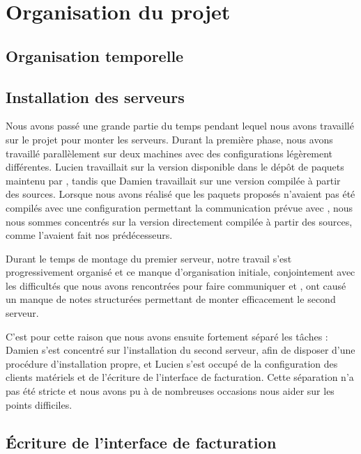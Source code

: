 \section{Organisation du projet}

\subsection{Organisation temporelle}


\todo[Commenter]




\subsection{Installation des serveurs}

Nous avons passé une grande partie du temps pendant lequel nous avons travaillé sur le projet pour monter les serveurs. Durant la première phase, nous avons travaillé parallèlement sur deux machines avec des configurations légèrement différentes. Lucien travaillait sur la version disponible dans le dépôt de paquets maintenu par {\kam}, tandis que Damien travaillait sur une version compilée à partir des sources. Lorsque nous avons réalisé que les paquets proposés n’avaient pas été compilés avec une configuration permettant la communication prévue avec {\frad}, nous nous sommes concentrés sur la version directement compilée à partir des sources, comme l’avaient fait nos prédécesseurs.

Durant le temps de montage du premier serveur, notre travail s’est progressivement organisé et ce manque d’organisation initiale, conjointement avec les difficultés que nous avons rencontrées pour faire communiquer {\kam} et {\frad}, ont causé un manque de notes structurées permettant de monter efficacement le second serveur.

C’est pour cette raison que nous avons ensuite fortement séparé les tâches : Damien s’est concentré sur l’installation du second serveur, afin de disposer d’une procédure d’installation propre, et Lucien s’est occupé de la configuration des clients matériels et de l’écriture de l’interface de facturation. Cette séparation n’a pas été stricte et nous avons pu à de nombreuses occasions nous aider sur les points difficiles.

\subsection{Écriture de l’interface de facturation}

